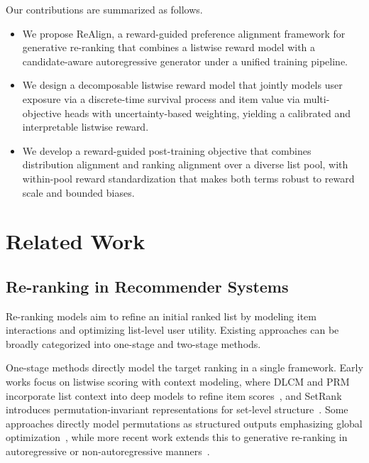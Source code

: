 \documentclass[sigconf]{acmart}
\begin{document}
Our contributions are summarized as follows.
\begin{itemize}
    \item We propose ReAlign, a reward-guided preference alignment framework for generative re-ranking that combines a listwise reward model with a candidate-aware autoregressive generator under a unified training pipeline.
    
    \item We design a decomposable listwise reward model that jointly models user exposure via a discrete-time survival process and item value via multi-objective heads with uncertainty-based weighting, yielding a calibrated and interpretable listwise reward.
    
    \item We develop a reward-guided post-training objective that combines distribution alignment and ranking alignment over a diverse list pool, with within-pool reward standardization that makes both terms robust to reward scale and bounded biases.

\end{itemize}

\section{Related Work}
\subsection{Re-ranking in Recommender Systems}
Re-ranking models aim to refine an initial ranked list by modeling item interactions and optimizing list-level user utility. Existing approaches can be broadly categorized into one-stage and two-stage methods.

One-stage methods directly model the target ranking in a single framework. Early works focus on listwise scoring with context modeling, where DLCM and PRM incorporate list context into deep models to refine item scores~\cite{ai2018learning, pei2019personalized}, and SetRank introduces permutation-invariant representations for set-level structure~\cite{pang2020setrank}. Some approaches directly model permutations as structured outputs emphasizing global optimization~\cite{zhuang2018globally, feng2021revisit}, while more recent work extends this to generative re-ranking in autoregressive or non-autoregressive manners~\cite{feng2021grn, ren2024non}.
\end{document}
